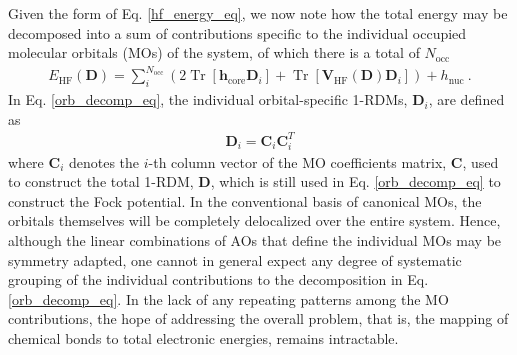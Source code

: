 \documentclass[journal=jctc,manuscript=article]{achemso}
\DeclareMathOperator{\tr}{Tr}
\begin{document}
Given the form of Eq. \ref{hf_energy_eq}, we now note how the total energy may be decomposed into a sum of contributions specific to the individual occupied molecular orbitals (MOs) of the system, of which there is a total of $N_{\text{occ}}$
%
\begin{align}
E_{\text{HF}}(\bm{D}) = \sum^{N_{\text{occ}}}_{i}(2\tr[\bm{h}_{\text{core}}\bm{D}_i] + \tr[\bm{V}_{\text{HF}}(\bm{D})\bm{D}_i]) + h_{\text{nuc}} \ . \label{orb_decomp_eq}
\end{align}
%
In Eq. \ref{orb_decomp_eq}, the individual orbital-specific 1-RDMs, $\bm{D}_i$, are defined as
%
\begin{align}
\bm{D}_i = \bm{C}_{i}\bm{C}^T_{i} \label{orb_spec_1rdm_eq}
\end{align}
%
where $\bm{C}_i$ denotes the $i$-th column vector of the MO coefficients matrix, $\bm{C}$, used to construct the total 1-RDM, $\bm{D}$, which is still used in Eq. \ref{orb_decomp_eq} to construct the Fock potential. In the conventional basis of canonical MOs, the orbitals themselves will be completely delocalized over the entire system. Hence, although the linear combinations of AOs that define the individual MOs may be symmetry adapted, one cannot in general expect any degree of systematic grouping of the individual contributions to the decomposition in Eq. \ref{orb_decomp_eq}. In the lack of any repeating patterns among the MO contributions, the hope of addressing the overall problem, that is, the mapping of chemical bonds to total electronic energies, remains intractable.\\
\end{document}
